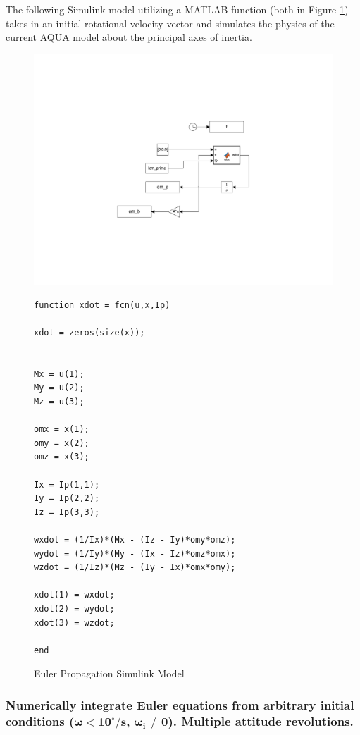 The following Simulink model utilizing a MATLAB function (both in Figure \ref{fig:euler_prop_model}) takes in an initial rotational velocity vector and simulates the physics of the current AQUA model about the principal axes of inertia.

\begin{figure}[H]
    \centering
    \includegraphics[trim={5cm 5cm 5cm 5cm},clip,width = 15cm]{Images/eulerPropagate.pdf}
\end{figure}

\begin{figure} [H]
    \centering
    \begin{lstlisting}
function xdot = fcn(u,x,Ip)

xdot = zeros(size(x));


Mx = u(1);
My = u(2);
Mz = u(3);

omx = x(1);
omy = x(2);
omz = x(3);

Ix = Ip(1,1);
Iy = Ip(2,2);
Iz = Ip(3,3);

wxdot = (1/Ix)*(Mx - (Iz - Iy)*omy*omz);
wydot = (1/Iy)*(My - (Ix - Iz)*omz*omx);
wzdot = (1/Iz)*(Mz - (Iy - Ix)*omx*omy);

xdot(1) = wxdot;
xdot(2) = wydot;
xdot(3) = wzdot;

end
    \end{lstlisting}
    \caption{Euler Propagation Simulink Model}
    \label{fig:euler_prop_model}
\end{figure}


\subsubsection{Numerically integrate Euler equations from arbitrary initial conditions ($\boldsymbol{\omega < 10^{\circ}/s}$, $\boldsymbol{\omega_i \neq 0}$). Multiple attitude revolutions.}

